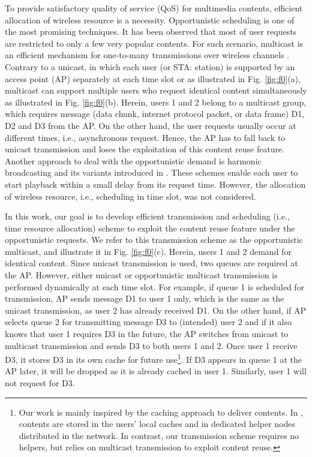 \documentclass[conference]{IEEEtran}
\newcommand{\0}{\vect{0}}
\newcommand{\1}{\vect{1}}
\begin{document}
To provide satisfactory quality of service (QoS) for multimedia contents, efficient allocation of wireless resource is a necessity. Opportunistic scheduling is one of the most promising techniques. It has been observed that most of user requests are restricted to only a few very popular contents. For such scenario, multicast is an efficient mechanism for one-to-many transmissions over wireless channels \cite{Won09WC,Low10WC,Tsa11WC}. Contrary to a unicast, in which each user (or STA: station) is supported by an access point (AP) separately at each time slot  or  as illustrated in Fig. \ref{fig:f0}(a), multicast can support multiple users who request identical content simultaneously as illustrated in Fig. \ref{fig:f0}(b). Herein, users 1 and 2 belong to a multicast group, which requires message (data chunk, internet protocol packet, or data frame) D1, D2 and D3 from the AP. On the other hand, the user requests usually occur at different times, i.e., asynchronous  request. Hence, the AP has to fall back to unicast transmission and loses the exploitation of this content reuse feature. Another approach to deal with the opportunistic demand is harmonic broadcasting and its variants introduced in \cite{Juh97B,Cha07CSVT}. These schemes enable each user to start playback within a small delay from its request time. However, the allocation of wireless resource, i.e., scheduling in time slot, was not considered.





In this work, our goal is to develop efficient transmission and scheduling (i.e., time resource allocation) scheme to exploit the content reuse feature under the opportunistic requests. We refer to this transmission scheme as the opportunistic multicast, and illustrate it in Fig. \ref{fig:f0}(c). Herein, users 1 and 2 demand for identical content. Since unicast transmission is used, two queues are required at the AP. However, either unicast or opportunistic  multicast transmission is performed dynamically at each time slot. For example, if queue 1 is scheduled for transmission, AP sends message D1 to user 1 only, which is the same as the unicast transmission, as user 2 has already received D1. On the other hand, if AP selects queue 2 for transmitting message D3 to (intended) user 2 and if it also knows that user 1 requires D3 in the future, the AP switches from unicast to multicast transmission and sends D3 to both users 1 and 2. Once user 1 receive D3, it stores D3 in its own cache for future use\footnote{Our work is mainly inspired by the caching approach to deliver contents. In \cite{Gol13Arx,Ji13ISIT,Bet13ISIT}, contents are stored in the users' local caches and in dedicated helper nodes distributed in the network. In contrast, our transmission scheme requires no helpers, but relies on multicast transmission to exploit content reuse.}. If D3 appears in queue 1 at the AP later, it will be dropped as it is already cached in user 1. Similarly, user 1 will not request for D3.
\end{document}
